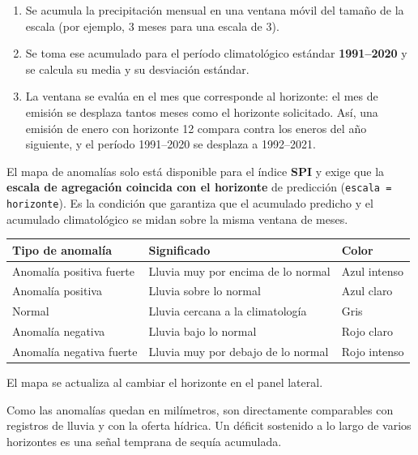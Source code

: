\begin{enumerate}
    \item Se acumula la precipitación mensual en una ventana móvil del tamaño de la escala (por ejemplo, 3 meses para una escala de 3).
    \item Se toma ese acumulado para el período climatológico estándar \textbf{1991--2020} y se calcula su media y su desviación estándar.
    \item La ventana se evalúa en el mes que corresponde al horizonte: el mes de emisión se desplaza tantos meses como el horizonte solicitado. Así, una emisión de enero con horizonte 12 compara contra los eneros del año siguiente, y el período 1991--2020 se desplaza a 1992--2021.
\end{enumerate}

\begin{remark}
El mapa de anomalías solo está disponible para el índice \textbf{SPI} y exige que la \textbf{escala de agregación coincida con el horizonte} de predicción (\texttt{escala = horizonte}). Es la condición que garantiza que el acumulado predicho y el acumulado climatológico se midan sobre la misma ventana de meses.
\end{remark}

\begin{center}
\small
\begin{tabular}{@{}lll@{}}
\toprule
\textbf{Tipo de anomalía} & \textbf{Significado} & \textbf{Color} \\
\midrule
Anomalía positiva fuerte  & Lluvia muy por encima de lo normal & Azul intenso \\
Anomalía positiva         & Lluvia sobre lo normal             & Azul claro \\
Normal                    & Lluvia cercana a la climatología   & Gris \\
Anomalía negativa         & Lluvia bajo lo normal              & Rojo claro \\
Anomalía negativa fuerte  & Lluvia muy por debajo de lo normal & Rojo intenso \\
\bottomrule
\end{tabular}
\end{center}

El mapa se actualiza al cambiar el horizonte en el panel lateral.

\begin{remark}
Como las anomalías quedan en milímetros, son directamente comparables con registros de lluvia y con la oferta hídrica. Un déficit sostenido a lo largo de varios horizontes es una señal temprana de sequía acumulada.
\end{remark}

